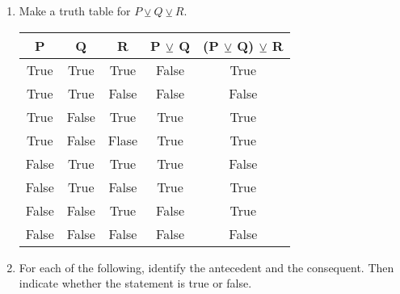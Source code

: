 \documentclass{letter}
\begin{document}
\begin{description}
\begin{enumerate}
\begin{enumerate}
			\end{enumerate}
	\item Make a truth table for $P\veebar Q\veebar R$.
                                  \begin{center}
                                    \begin{tabular}{||c|c|c|c|c||}
                                    \hline
                                    P & Q & R & P $\veebar$ Q & (P $\veebar$ Q) $\veebar$ R\\ \hline
                                    True & True & True & False & True\\ \hline
                                    True & True & False & False & False\\ \hline
                                    True & False & True & True & True\\ \hline
                                    True & False & Flase & True & True\\ \hline
                                    False & True & True & True & False\\ \hline
                                    False & True & False & True & True\\ \hline
                                    False & False & True  & False & True\\ \hline 
                                    False & False & False  & False& False\\ 
                                    \hline
                                    \end{tabular}
                                    \end{center}
	\item For each of the following, identify the antecedent and the consequent. Then indicate whether the statement is true or false. \\
		

\end{enumerate}
\end{description}
\end{document}
